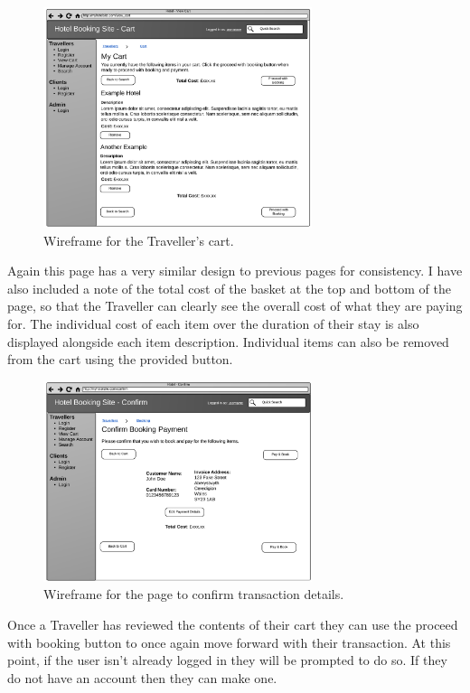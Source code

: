 \documentclass{article}
\begin{document}
\begin{figure}[H]
\centering
\includegraphics[width=0.7\textwidth]{img/wireframes/Cart.png}
\caption{Wireframe for the Traveller's cart.}
\label{fig:wireframe-traveller-cart}
\end{figure}

Again this page has a very similar design to previous pages for consistency. I have also included a note of the total cost of the basket at the top and bottom of the page, so that the Traveller can clearly see the overall cost of what they are paying for. The individual cost of each item over the duration of their stay is also displayed alongside each item description. Individual items can also be removed from the cart using the provided button.

\begin{figure}[H]
\centering
\includegraphics[width=0.7\textwidth]{img/wireframes/ConfirmBooking.png}
\caption{Wireframe for the page to confirm transaction details.}
\label{fig:wireframe-traveller-confirm}
\end{figure}

Once a Traveller has reviewed the contents of their cart they can use the proceed with booking button to once again move forward with their transaction. At this point, if the user isn't already logged in they will be prompted to do so. If they do not have an account then they can make one. 
\end{document}

